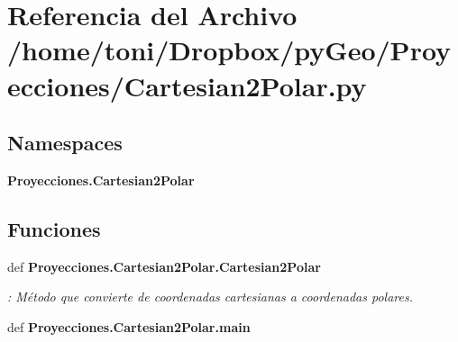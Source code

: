 \section{Referencia del Archivo /home/toni/\-Dropbox/py\-Geo/\-Proyecciones/\-Cartesian2\-Polar.py}
\label{Cartesian2Polar_8py}
\subsection*{Namespaces}
\begin{DoxyCompactItemize}
\item 
{\bf Proyecciones.\-Cartesian2\-Polar}
\end{DoxyCompactItemize}
\subsection*{Funciones}
\begin{DoxyCompactItemize}
\item 
def {\bf Proyecciones.\-Cartesian2\-Polar.\-Cartesian2\-Polar}
\begin{DoxyCompactList}\small\item\em \-: Método que convierte de coordenadas cartesianas a coordenadas polares. \end{DoxyCompactList}\item 
def {\bf Proyecciones.\-Cartesian2\-Polar.\-main}
\end{DoxyCompactItemize}

